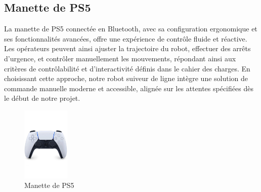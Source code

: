 \subsection{Manette de PS5}
La manette de PS5 connectée en Bluetooth, avec sa configuration ergonomique et ses fonctionnalités avancées, offre une expérience de contrôle fluide et réactive. Les opérateurs peuvent ainsi ajuster la trajectoire du robot, effectuer des arrêts d'urgence, et contrôler manuellement les mouvements, répondant ainsi aux critères de contrôlabilité et d'interactivité définis dans le cahier des charges. En choisissant cette approche, notre robot suiveur de ligne intègre une solution de commande manuelle moderne et accessible, alignée sur les attentes spécifiées dès le début de notre projet.

\begin{figure}[h]
    \centering
    \includegraphics[width=0.2\textwidth]{images/components/manette_ps5.jpg}
    \caption{Manette de PS5}
    \label{fig:Manette de PS5}
\end{figure}

\newpage